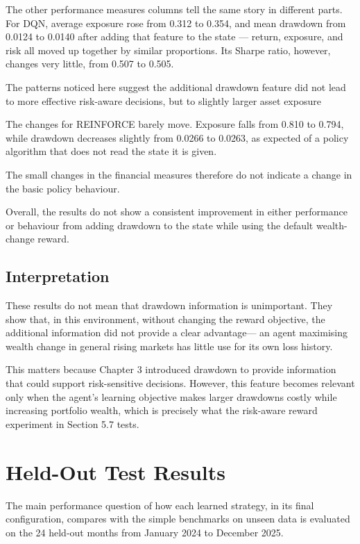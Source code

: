 The other performance measures columns tell the same story in different
parts. For DQN, average exposure rose from 0.312 to 0.354, and mean
drawdown from 0.0124 to 0.0140 after adding that feature to the state
--- return, exposure, and risk all moved up together by similar
proportions. Its Sharpe ratio, however, changes very little, from 0.507
to 0.505.

The patterns noticed here suggest the additional drawdown feature did
not lead to more effective risk-aware decisions, but to slightly larger
asset exposure

The changes for REINFORCE barely move. Exposure falls from 0.810 to
0.794, while drawdown decreases slightly from 0.0266 to 0.0263, as
expected of a policy algorithm that does not read the state it is given.

The small changes in the financial measures therefore do not indicate a
change in the basic policy behaviour.

Overall, the results do not show a consistent improvement in either
performance or behaviour from adding drawdown to the state while using
the default wealth-change reward.

\subsection{Interpretation}

These results do not mean that drawdown information is unimportant. They
show that, in this environment, without changing the reward objective,
the additional information did not provide a clear advantage--- an agent
maximising wealth change in general rising markets has little use for
its own loss history.

This matters because Chapter 3 introduced drawdown to provide
information that could support risk-sensitive decisions. However, this
feature becomes relevant only when the agent's learning objective makes
larger drawdowns costly while increasing portfolio wealth, which is
precisely what the risk-aware reward experiment in Section 5.7 tests.

\section{Held-Out Test Results}

The main performance question of how each learned strategy, in its final
configuration, compares with the simple benchmarks on unseen data is
evaluated on the 24 held-out months from January 2024 to December 2025.

